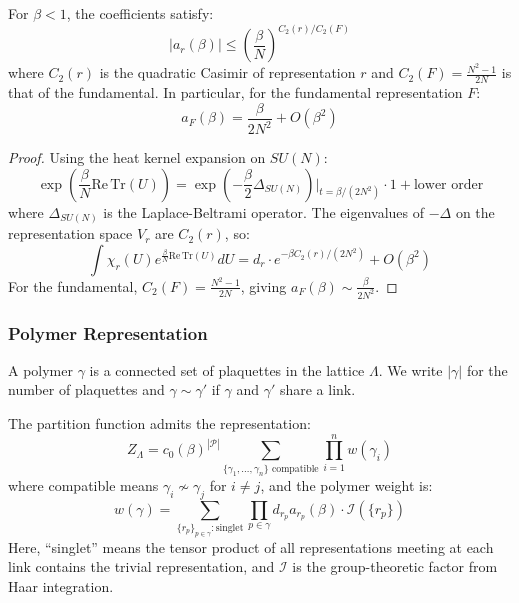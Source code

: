 \begin{lemma}
\label{lem:character_bounds}
For $\beta < 1$, the coefficients satisfy:
\begin{equation}
|a_r(\beta)| \leq \left(\frac{\beta}{N}\right)^{C_2(r)/C_2(F)}
\end{equation}
where $C_2(r)$ is the quadratic Casimir of representation $r$ and $C_2(F) = \frac{N^2-1}{2N}$ is that of the fundamental. In particular, for the fundamental representation $F$:
\begin{equation}
a_F(\beta) = \frac{\beta}{2N^2} + O(\beta^2)
\end{equation}
\end{lemma}

\begin{proof}
Using the heat kernel expansion on $SU(N)$:
\begin{equation}
\exp\left(\frac{\beta}{N}\mathrm{Re}\,\mathrm{Tr}(U)\right) = \exp\left(-\frac{\beta}{2}\Delta_{SU(N)}\right)\Big|_{t=\beta/(2N^2)} \cdot 1 + \text{lower order}
\end{equation}
where $\Delta_{SU(N)}$ is the Laplace-Beltrami operator. The eigenvalues of $-\Delta$ on the representation space $V_r$ are $C_2(r)$, so:
\begin{equation}
\int \chi_r(U) e^{\frac{\beta}{N}\mathrm{Re}\,\mathrm{Tr}(U)} dU = d_r \cdot e^{-\beta C_2(r)/(2N^2)} + O(\beta^2)
\end{equation}
For the fundamental, $C_2(F) = \frac{N^2-1}{2N}$, giving $a_F(\beta) \sim \frac{\beta}{2N^2}$.
\end{proof}

\subsubsection{Polymer Representation}

\begin{definition}[Polymer]
A polymer $\gamma$ is a connected set of plaquettes in the lattice $\Lambda$. We write $|\gamma|$ for the number of plaquettes and $\gamma \sim \gamma'$ if $\gamma$ and $\gamma'$ share a link.
\end{definition}

\begin{lemma}
\label{lem:polymer_expansion}
The partition function admits the representation:
\begin{equation}
Z_\Lambda = c_0(\beta)^{|\mathcal{P}|} \sum_{\{\gamma_1, \ldots, \gamma_n\} \text{ compatible}} \prod_{i=1}^n w(\gamma_i)
\end{equation}
where compatible means $\gamma_i \not\sim \gamma_j$ for $i \neq j$, and the polymer weight is:
\begin{equation}
w(\gamma) = \sum_{\{r_p\}_{p \in \gamma} : \text{singlet}} \prod_{p \in \gamma} d_{r_p} a_{r_p}(\beta) \cdot \mathcal{I}(\{r_p\})
\end{equation}
Here, ``singlet'' means the tensor product of all representations meeting at each link contains the trivial representation, and $\mathcal{I}$ is the group-theoretic factor from Haar integration.
\end{lemma}

